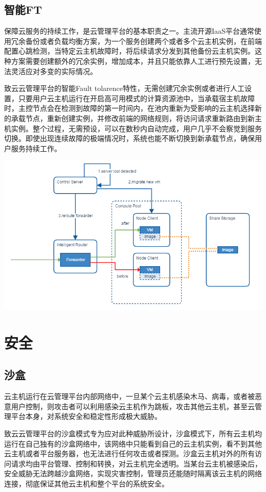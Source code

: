 \documentclass[letterpaper,10pt]{sphinxmanual}
\begin{document}
\section{智能FT}
\label{index:ft}
保障云服务的持续工作，是云管理平台的基本职责之一。主流开源IaaS平台通常使用冗余备份或者负载均衡方案，为一个服务创建两个或者多个云主机实例，在前端配置心跳检测，当特定云主机故障时，将后续请求分发到其他备份云主机实例。这种方案需要创建额外的冗余实例，增加成本，并且只能依靠人工进行预先设置，无法灵活应对多变的实际情况。

致云云管理平台的智能Fault tolarence特性，无需创建冗余实例或者进行人工设置，只要用户云主机运行在开启高可用模式的计算资源池中，当承载宿主机故障时，主控节点会在检测到故障的第一时间内，在池内重新为受影响的云主机选择新的承载节点，重新创建实例，并修改前端的网络规则，将访问请求重新路由到新主机实例。整个过程，无需预设，可以在数秒内自动完成，用户几乎不会察觉到服务切换。即使出现连续故障的极端情况时，系统也能不断切换到新承载节点，确保用户服务持续工作。

\includegraphics{4_5_failover.png}


\chapter{安全}
\label{index:id22}

\section{沙盒}
\label{index:id23}
云主机运行在云管理平台内部网络中，一旦某个云主机感染木马、病毒，或者被恶意用户控制，则攻击者可以利用感染云主机作为跳板，攻击其他云主机，甚至云管理平台本身，对系统安全和稳定性形成极大威胁。

致云云管理平台的沙盒模式专为应对此种威胁所设计，沙盒模式下，所有云主机均运行在自己独有的沙盒网络中，该网络中只能看到自己的云主机实例，看不到其他云主机或者平台服务器，也无法进行任何攻击或者探测。沙盒云主机对外的所有访问请求均由平台管理、控制和转换，对云主机完全透明。当某台云主机被感染后，安全威胁无法跨越沙盒网络，实现灾害控制，管理员还能随时隔离该云主机的网络连接，彻底保证其他云主机和整个平台的系统安全。
\end{document}
